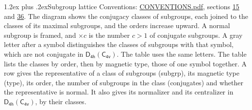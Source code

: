\documentclass[10pt,a4paper]{article}
\makeatletter
\renewcommand\section{\@startsection{section}{1}{\z@}{-3ex plus -1ex minus -.2ex}%
  {1.2ex plus .2ex}{\normalfont\large\sffamily\bfseries\color{parttitle}}}
\numberwithin{equation}{section}
\newcommand{\grp}[1]{\mathsf{#1}}
\makeatother
\begin{document}
\section{Subgroup lattice}\label{s:subgroups}
Conventions: \href{../../CONVENTIONS.pdf}{CONVENTIONS.pdf}, sections \href{../../../rotation/CONVENTIONS.pdf\#conv.15}{15} and \href{../../CONVENTIONS.pdf\#conv.36}{36}.
The diagram shows the conjugacy classes of subgroups, each joined to the classes of its maximal subgroups, and the orders increase upward. \label{n:index.conjugates.c}\label{n:mark.conjugates}A normal subgroup is framed, and ${\times}c$ is the number $c > 1$ of conjugate subgroups. \label{n:mark.letter}A gray letter after a symbol distinguishes the classes of subgroups with that symbol, which are not conjugate in $\grp{D_{4h}}(\grp{C_{4v}})$. The table uses the same letters. The table lists the classes by order, then by magnetic type, those of one symbol together. \label{n:head.subgroup}\label{n:head.magnetic.type}\label{n:head.order}\label{n:head.conjugates}\label{n:head.normal}A row gives the representative of a class of subgroups (subgrp), its magnetic type (type), its order, the number of subgroups in the class (conjugates) and whether the representative is normal. \label{n:head.normalizer}\label{n:head.centralizer}It also gives its normalizer and its centralizer in $\grp{D_{4h}}(\grp{C_{4v}})$, by their classes. 
\end{document}
